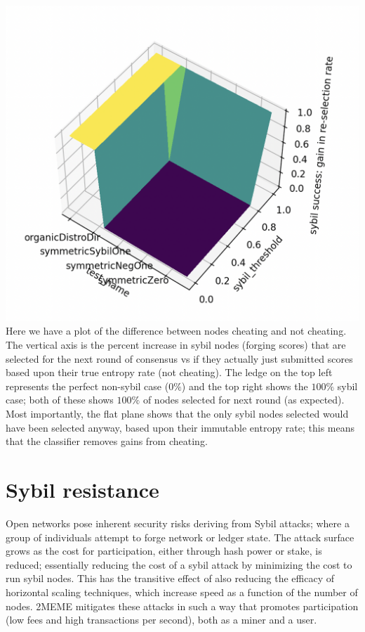 \documentclass{article}
\begin{document}
\includegraphics[width=\textwidth, height=\textwidth]{attack-success-suface-plot}
Here we have a plot of the difference between nodes cheating and not cheating. The vertical axis is the percent increase in sybil nodes (forging scores) that are selected for the next round of consensus vs if they actually just submitted scores based upon their true entropy rate (not cheating). The ledge on the top left represents the perfect non-sybil case ($0\%$) and the top right shows the $100\%$ sybil case; both of these shows $100\%$ of nodes selected for next round (as expected). Most importantly, the flat plane shows that the only sybil nodes selected would have been selected anyway, based upon their immutable entropy rate; this means that the classifier removes gains from cheating.

\section{Sybil resistance}
Open networks pose inherent security risks deriving from Sybil attacks; where a group of individuals attempt to forge network or ledger state. The attack surface grows as the cost for participation, either through hash power or stake, is reduced; essentially reducing the cost of a sybil attack by minimizing the cost to run sybil nodes. This has the transitive effect of also reducing the efficacy of horizontal scaling techniques, which increase speed as a function of the number of nodes. 2MEME mitigates these attacks in such a way that promotes participation (low fees and high transactions per second), both as a miner and a user. 
\end{document}
